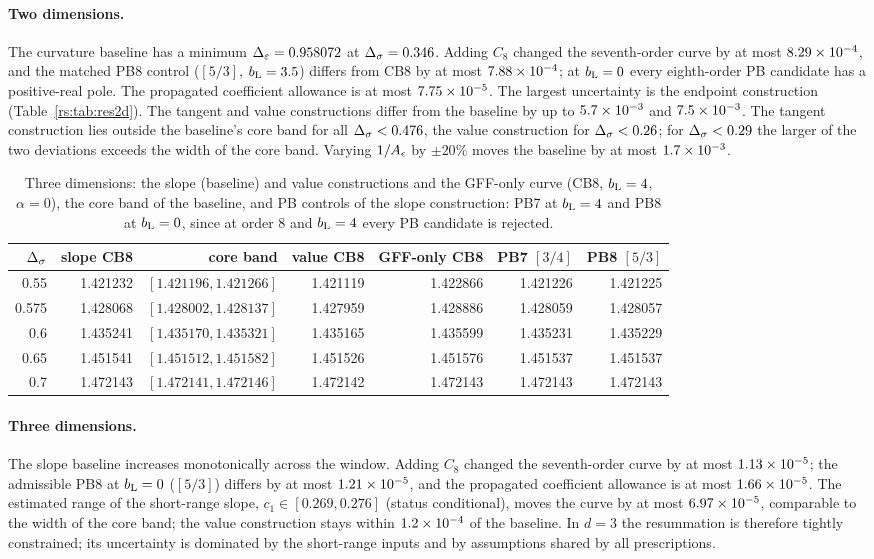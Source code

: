 \paragraph{Two dimensions.} The curvature baseline has a minimum
$\Delta_\varepsilon=0.958072$ at $\Delta_\sigma=0.346$. Adding $C_8$ changed the seventh-order curve by at most
$8.29\times10^{-4}$, and the matched PB8 control ($[5/3]$, $b_{\mathrm L}=3.5$) differs from CB8 by at most
$7.88\times10^{-4}$; at $b_{\mathrm L}=0$ every eighth-order PB candidate has a positive-real pole. The
propagated coefficient allowance is at most $7.75\times10^{-5}$. The largest uncertainty is
the endpoint construction (Table~\ref{rs:tab:res2d}). The tangent and value constructions
differ from the baseline by up to $5.7\times10^{-3}$ and $7.5\times10^{-3}$. The tangent
construction lies outside the baseline's core band for all $\Delta_\sigma<0.476$, the value
construction for $\Delta_\sigma<0.26$; for $\Delta_\sigma<0.29$ the larger of the two deviations exceeds the
width of the core band. Varying $1/A_\epsilon$ by $\pm20\%$ moves the baseline by at most
$1.7\times10^{-3}$.

\begin{table}[htbp]\centering\small
\begin{tabular}{@{}r r r r r r r@{}}
\toprule
$\Delta_\sigma$ & slope CB8 & core band & value CB8 & GFF-only CB8 & PB7 $[3/4]$ & PB8 $[5/3]$\\ \midrule
0.55 & 1.421232 & $[1.421196,1.421266]$ & 1.421119 & 1.422866 & 1.421226 & 1.421225\\
0.575 & 1.428068 & $[1.428002,1.428137]$ & 1.427959 & 1.428886 & 1.428059 & 1.428057\\
0.6 & 1.435241 & $[1.435170,1.435321]$ & 1.435165 & 1.435599 & 1.435231 & 1.435229\\
0.65 & 1.451541 & $[1.451512,1.451582]$ & 1.451526 & 1.451576 & 1.451537 & 1.451537\\
0.7 & 1.472143 & $[1.472141,1.472146]$ & 1.472142 & 1.472143 & 1.472143 & 1.472143\\
\bottomrule
\end{tabular}
\caption{Three dimensions: the slope (baseline) and value constructions and the GFF-only
curve (CB8, $b_{\mathrm L}=4$, $\alpha=0$), the core band of the baseline, and PB controls of the slope
construction: PB7 at $b_{\mathrm L}=4$ and PB8 at $b_{\mathrm L}=0$, since at order 8 and $b_{\mathrm L}=4$ every PB
candidate is rejected.}
\label{rs:tab:res3d}
\end{table}

\paragraph{Three dimensions.} The slope baseline increases monotonically across the
window. Adding $C_8$ changed the seventh-order curve by at most $1.13\times10^{-5}$; the
admissible PB8 at $b_{\mathrm L}=0$ ($[5/3]$) differs by at most $1.21\times10^{-5}$, and the propagated
coefficient allowance is at most $1.66\times10^{-5}$. The estimated range of the short-range
slope, $c_1\in[0.269,0.276]$ (status conditional), moves the curve by at most $6.97\times10^{-5}$, comparable to the
width of the core band; the value construction stays within $1.2\times10^{-4}$ of the
baseline. In $d=3$ the resummation is therefore tightly constrained; its uncertainty is
dominated by the short-range inputs and by assumptions shared by all prescriptions.

